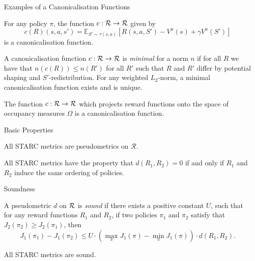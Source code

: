 \documentclass{beamer}
\begin{document}
\begin{frame}{Examples of a Canonicalisation Functions}
    \small
    \begin{proposition}%
        For any policy $\pi$, the function $c : \mathcal{R} \to \mathcal{R}$ given by 
        $$
        c(R)(s,a,s') = \mathbb{E}_{S' \sim \tau(s,a)}\left[R(s,a,S') - V^\pi(s) + \gamma V^\pi(S')\right]
        $$
        is a canonicalisation function. 
    \end{proposition}

    \begin{proposition}%
        A canonicalisation function $c : \mathcal{R} \to \mathcal{R}$ is \emph{minimal} for a norm $n$ if for all $R$ we have that $n(c(R)) \leq n(R')$ for all $R'$ such that $R$ and $R'$ differ by potential shaping and $S'$-redistribution. For any weighted $L_2$-norm, a minimal canonicalisation function exists and is unique.
    \end{proposition}

    \begin{proposition}%
        The function $c : \mathcal{R} \to \mathcal{R}$ which projects reward functions onto the space of occupancy measures $\Omega$ is a canonicalisation function.
    \end{proposition}
\end{frame}

\begin{frame}{Basic Properties}
    \small
    \begin{proposition}\label{prop:STARC_pseudometrics}
        All STARC metrics are pseudometrics on $\mathcal{R}$.
    \end{proposition}
    
    \vspace{1cm}
    \begin{proposition}\label{prop:STARC_distance_zero}
    All STARC metrics have the property that $d(R_1, R_2) = 0$ if and only if $R_1$ and $R_2$ induce the same ordering of policies.
    \end{proposition}
\end{frame}

\begin{frame}{Soundness}
    \small
    \begin{definition}\label{def:soundness}
    A pseudometric $d$ on $\mathcal{R}$ is \emph{sound} if there exists a positive constant $U$, such that for any reward functions $R_1$ and $R_2$, if two policies $\pi_1$ and $\pi_2$ satisfy that $J_2(\pi_2) \geq J_2(\pi_1)$, then
    $$
    J_1(\pi_1) - J_1(\pi_2) \leq U \cdot (\max_\pi J_1(\pi) - \min_\pi J_1(\pi)) \cdot d(R_1, R_2).
    $$
    \end{definition}

    \begin{theorem}\label{thm:STARC_sound}
    All STARC metrics are sound.
    \end{theorem}
\end{frame}
\end{document}

